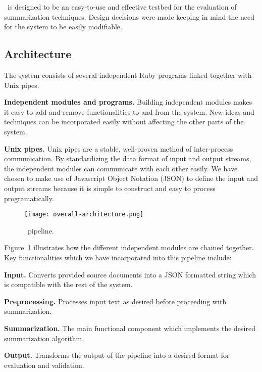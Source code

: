 \SWING\ is designed to be an easy-to-use and effective testbed for the evaluation of summarization techniques. Design decisions were made keeping in mind the need for the system to be easily modifiable. 

\subsection{Architecture}
The system consists of several independent Ruby programs linked together with Unix pipes.

\textbf{Independent modules and programs.} Building independent modules makes it easy to add and remove functionalities to and from the system. New ideas and techniques can be incorporated easily without affecting the other parts of the system.

\textbf{Unix pipes.} Unix pipes are a stable, well-proven method of inter-process communication. By standardizing the data format of input and output streams, the independent modules can communicate with each other easily. We have chosen to make use of Javascript Object Notation (JSON) to define the input and output streams because it is simple to construct and easy to process programatically.

\begin{figure}
\centering		
\texttt{[image: overall-architecture.png]}
\caption{\SWING\ pipeline.}
\label{fig:swing-pipeline}
\end{figure}

Figure~\ref{fig:swing-pipeline} illustrates how the different independent modules are chained together. Key functionalities which we have incorporated into this  pipeline include:

\textbf{Input.} Converts provided source documents into a JSON formatted string which is compatible with the rest of the system.

\textbf{Preprocessing.} Processes input text as desired before proceeding with summarization.

\textbf{Summarization.} The main functional component which implements the desired summarization algorithm.

\textbf{Output.} Transforms the output of the pipeline into a desired format for evaluation and validation.

